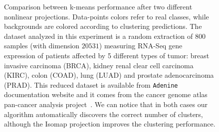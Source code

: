 \documentclass[twoside,11pt]{article}
\makeatletter
\newcommand{\ade}{\texttt{Adenine}\@\xspace}
\makeatother
\begin{document}
\begin{figure}[h!] 
    \centering
    \hfill%
\caption{Comparison between k-means performance after two different nonlinear projections. Data-points colors refer to real classes, while backgrounds are colored according to clustering predictions. The dataset analyzed in this experiment is a random extraction of $800$ samples (with dimension $20531$) measuring RNA-Seq gene expression of patients affected by 5 different types of tumor: breast invasive carcinoma (BRCA), kidney renal clear cell carcinoma (KIRC), colon  (COAD), lung  (LUAD) and prostate adenocarcinoma (PRAD). This reduced dataset is available from \ade documentation website and it comes from the cancer genome atlas pan-cancer analysis project~\citep{weinstein2013cancer}. We can notice that in both cases our algorithm automatically discovers the correct number of clusters, although the Isomap projection improves the clustering performance.} \label{fig:scatter}
\end{figure}




\end{document}
